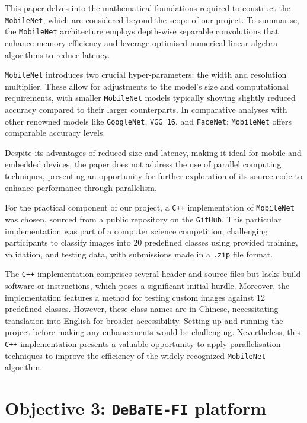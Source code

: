 This paper\cite{mobilenet_paper} delves into the mathematical foundations required to construct the \texttt{MobileNet}, which are considered beyond the scope of our project. To summarise, the \texttt{MobileNet} architecture employs depth-wise separable convolutions that enhance memory efficiency and leverage optimised numerical linear algebra algorithms to reduce latency.

\texttt{MobileNet} introduces two crucial hyper-parameters: the width and resolution multiplier. These allow for adjustments to the model's size and computational requirements, with smaller \texttt{MobileNet} models typically showing slightly reduced accuracy compared to their larger counterparts. In comparative analyses with other renowned models like \texttt{GoogleNet}, \texttt{VGG 16}, and \texttt{FaceNet}; \texttt{MobileNet} offers comparable accuracy levels.

Despite its advantages of reduced size and latency, making it ideal for mobile and embedded devices, the paper\cite{mobilenet_paper} does not address the use of parallel computing techniques, presenting an opportunity for further exploration of its source code to enhance performance through parallelism.

For the practical component of our project, a \texttt{C++} implementation of \texttt{MobileNet} was chosen, sourced from a public repository on the \texttt{GitHub}\cite{mobilenet_repo}. This particular implementation was part of a computer science competition\cite{mobilenet_competition}, challenging participants to classify images into 20 predefined classes using provided training, validation, and testing data, with submissions made in a \texttt{.zip} file format.

The \texttt{C++} implementation comprises several header and source files but lacks build software or instructions, which poses a significant initial hurdle. Moreover, the implementation features a method for testing custom images against 12 predefined classes. However, these class names are in Chinese, necessitating translation into English for broader accessibility. Setting up and running the project before making any enhancements would be challenging. Nevertheless, this \texttt{C++} implementation presents a valuable opportunity to apply parallelisation techniques to improve the efficiency of the widely recognized \texttt{MobileNet} algorithm.

\section{Objective 3: \texttt{DeBaTE-FI} platform}

